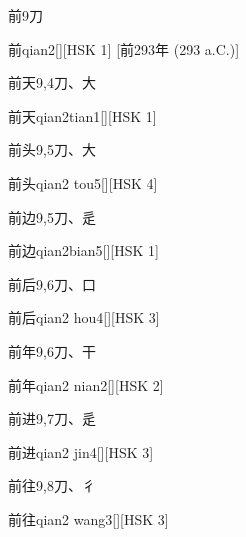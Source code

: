 \begin{entry}{前}{9}{⼑}
  \begin{phonetics}{前}{qian2}[][HSK 1]
    [前293年  (293 a.C.)]
  \end{phonetics}
\end{entry}

\begin{entry}{前天}{9,4}{⼑、⼤}
  \begin{phonetics}{前天}{qian2tian1}[][HSK 1]
  \end{phonetics}
\end{entry}

\begin{entry}{前头}{9,5}{⼑、⼤}
  \begin{phonetics}{前头}{qian2 tou5}[][HSK 4]
  \end{phonetics}
\end{entry}

\begin{entry}{前边}{9,5}{⼑、⾡}
  \begin{phonetics}{前边}{qian2bian5}[][HSK 1]
  \end{phonetics}
\end{entry}

\begin{entry}{前后}{9,6}{⼑、⼝}
  \begin{phonetics}{前后}{qian2 hou4}[][HSK 3]
  \end{phonetics}
\end{entry}

\begin{entry}{前年}{9,6}{⼑、⼲}
  \begin{phonetics}{前年}{qian2 nian2}[][HSK 2]
  \end{phonetics}
\end{entry}

\begin{entry}{前进}{9,7}{⼑、⾡}
  \begin{phonetics}{前进}{qian2 jin4}[][HSK 3]
  \end{phonetics}
\end{entry}

\begin{entry}{前往}{9,8}{⼑、⼻}
  \begin{phonetics}{前往}{qian2 wang3}[][HSK 3]
  \end{phonetics}
\end{entry}

